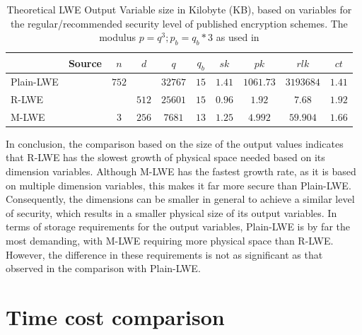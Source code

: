 \begin{table}[h]
  \centering
  \caption[Theoretical LWE HE output variable sizes]{Theoretical LWE Output Variable size in Kilobyte (KB), based on variables for the regular/recommended security level of published encryption schemes. The modulus $p=q^3; p_b=q_b*3$ as used in \cite{bfv}}
  \begin{tabular}{|l|c||c|c|c|c||c|c|c|c|}
    \toprule
              & Source                      & $n$   & $d$   & $q$      & $q_b$ & $sk$    & $pk$      & $rlk$    & $ct$    \\
    \midrule
    Plain-LWE & \cite{frodo}                & $752$ &       & $32767$  & $15$  & $1.41$  & $1061.73$ & $3193684$ & $1.41$ \\
    R-LWE     & \cite{PracticalKeyExchange} &       & $512$ & $25601$ & $15$  & $0.96$  & $1.92$    & $7.68$   & $1.92$  \\
    M-LWE     & \cite{CyrstalsKyber}        & $3$   & $256$ & $7681$   & $13$  & $1.25$ & $4.992$   & $59.904$ & $1.66$ \\
    \bottomrule
  \end{tabular}
  \label{table:OutputVariableInKB}
\end{table}

In conclusion, the comparison based on the size of the output values indicates that R-LWE has the slowest growth of physical space needed based on its dimension variables. Although M-LWE has the fastest growth rate, as it is based on multiple dimension variables, this makes it far more secure than Plain-LWE. Consequently, the dimensions can be smaller in general to achieve a similar level of security, which results in a smaller physical size of its output variables. In terms of storage requirements for the output variables, Plain-LWE is by far the most demanding, with M-LWE requiring more physical space than R-LWE. However, the difference in these requirements is not as significant as that observed in the comparison with Plain-LWE.

\section{Time cost comparison}

